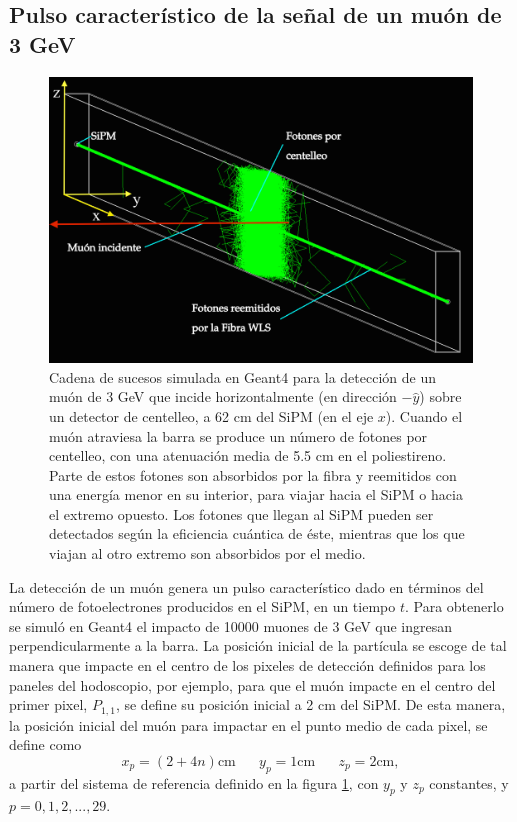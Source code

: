 \documentclass[12pt,oneside,openany,letter]{book}
\begin{document}
\subsection{Pulso característico de la señal de un muón de 3 GeV}
\begin{figure}[h!]
    \centering
     \includegraphics[scale=0.45]{images/11.png}
   \caption[Cadena de sucesos para la detección de un muón de 3 GeV que incide horizontalmente sobre un detector de centelleo]{Cadena de sucesos simulada en Geant4 para la detección de un muón de 3 GeV que incide horizontalmente (en direcci\'on $-\hat{y}$) sobre un detector de centelleo, a 62 cm del SiPM (en el eje $x$). Cuando el muón atraviesa la barra se produce un número de fotones por centelleo, con una atenuaci\'on media de 5.5 cm en el poliestireno. Parte de estos fotones son absorbidos por la fibra y reemitidos con una energía menor en su interior, para viajar hacia el SiPM o hacia el extremo opuesto. Los fotones que llegan al SiPM pueden ser detectados según la eficiencia cu\'antica de \'este, mientras que los que viajan al otro extremo son absorbidos por el medio.}\label{barra_muon}
\end{figure}

La detección de un muón genera un pulso característico dado en términos del número de fotoelectrones producidos en el SiPM, en un tiempo $t$. Para obtenerlo se simuló en Geant4 el impacto de 10000 muones de 3 GeV que ingresan perpendicularmente a la barra. La posici\'on inicial de la part\'icula se escoge de tal manera que impacte en el centro de los pixeles de detecci\'on definidos para los paneles del hodoscopio, por ejemplo, para que el mu\'on impacte en el centro del primer pixel, $P_{1,1}$, se define su posici\'on inicial a 2 cm del SiPM. De esta manera, la posici\'on inicial del mu\'on para impactar en el punto medio de cada pixel, se define como 
\begin{equation}
\label{posiciones}
x_p = (2 + 4n)\mathrm{cm} \,\,\,\,\,\,\,\,\,\, y_p = 1\mathrm{cm}  \,\,\,\,\,\,\,\,\,\, z_p = 2\mathrm{cm},
\end{equation}
a partir del sistema de referencia definido en la figura \ref{barra_muon}, con $y_p$ y $z_p$ constantes, y $p=0,1,2,...,29$. 
\end{document}

